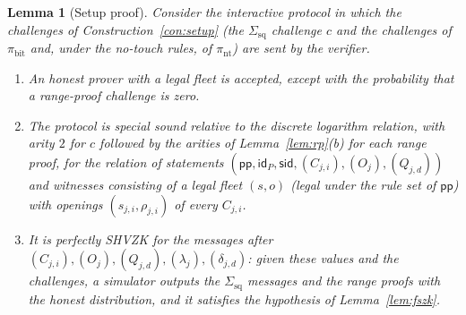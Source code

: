 \documentclass[11pt]{article}
\newtheorem{lemma}{Lemma}[section]
\theoremstyle{definition}
\theoremstyle{remark}
\newcommand{\sid}{\mathsf{sid}}
\newcommand{\id}{\mathsf{id}}
\newcommand{\pp}{\mathsf{pp}}
\newcommand{\Sq}{\Sigma_{\mathrm{sq}}}
\begin{document}
\begin{lemma}[Setup proof]\label{lem:setup}
Consider the interactive protocol in which the challenges of Construction~\ref{con:setup} (the $\Sq$ challenge $c$ and the challenges of $\pi_{\mathrm{bit}}$ and, under the no-touch rules, of $\pi_{\mathrm{nt}}$) are sent by the verifier.
\begin{enumerate}[label=(\alph*)]
  \item An honest prover with a legal fleet is accepted, except with the probability that a range-proof challenge is zero.
  \item The protocol is special sound relative to the discrete logarithm relation, with arity $2$ for $c$ followed by the arities of Lemma~\ref{lem:rp}(b) for each range proof, for the relation of statements $(\pp,\id_P,\sid,(C_{j,i}),(O_j),(Q_{j,d}))$ and witnesses consisting of a legal fleet $(s,o)$ (legal under the rule set of $\pp$) with openings $(s_{j,i},\rho_{j,i})$ of every $C_{j,i}$.
  \item It is perfectly SHVZK for the messages after $(C_{j,i}),(O_j),(Q_{j,d}),(\lambda_j),(\delta_{j,d})$: given these values and the challenges, a simulator outputs the $\Sq$ messages and the range proofs with the honest distribution, and it satisfies the hypothesis of Lemma~\ref{lem:fszk}.
\end{enumerate}
\end{lemma}
\end{document}
